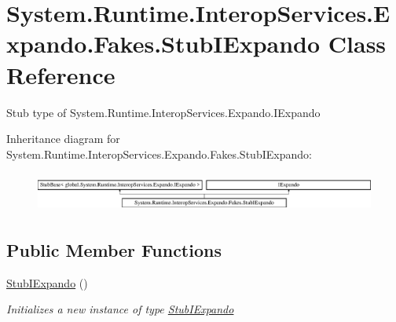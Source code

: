 \hypertarget{class_system_1_1_runtime_1_1_interop_services_1_1_expando_1_1_fakes_1_1_stub_i_expando}{\section{System.\-Runtime.\-Interop\-Services.\-Expando.\-Fakes.\-Stub\-I\-Expando Class Reference}
\label{class_system_1_1_runtime_1_1_interop_services_1_1_expando_1_1_fakes_1_1_stub_i_expando}
}


Stub type of System.\-Runtime.\-Interop\-Services.\-Expando.\-I\-Expando 


Inheritance diagram for System.\-Runtime.\-Interop\-Services.\-Expando.\-Fakes.\-Stub\-I\-Expando\-:\begin{figure}[H]
\begin{center}
\leavevmode
\includegraphics[height=1.317647cm]{class_system_1_1_runtime_1_1_interop_services_1_1_expando_1_1_fakes_1_1_stub_i_expando}
\end{center}
\end{figure}
\subsection*{Public Member Functions}
\begin{DoxyCompactItemize}
\item 
\hyperlink{class_system_1_1_runtime_1_1_interop_services_1_1_expando_1_1_fakes_1_1_stub_i_expando_a599445607914104494767b829bf9f475}{Stub\-I\-Expando} ()
\begin{DoxyCompactList}\small\item\em Initializes a new instance of type \hyperlink{class_system_1_1_runtime_1_1_interop_services_1_1_expando_1_1_fakes_1_1_stub_i_expando}{Stub\-I\-Expando}\end{DoxyCompactList}\end{DoxyCompactItemize}
